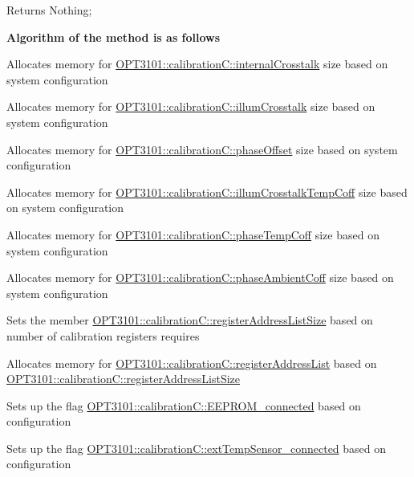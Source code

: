 \begin{DoxyReturn}{Returns}
Nothing; 
\end{DoxyReturn}
{\bfseries Algorithm of the method is as follows}
\begin{DoxyItemize}
\item Allocates memory for \mbox{\hyperlink{class_o_p_t3101_1_1calibration_c_a4df5b876541e9b33eadf6290fe08b7e5}{O\+P\+T3101\+::calibration\+C\+::internal\+Crosstalk}} size based on system configuration
\item Allocates memory for \mbox{\hyperlink{class_o_p_t3101_1_1calibration_c_ac09121c7057093506de63d6e2ea3a4b7}{O\+P\+T3101\+::calibration\+C\+::illum\+Crosstalk}} size based on system configuration
\item Allocates memory for \mbox{\hyperlink{class_o_p_t3101_1_1calibration_c_a06f6a097057b9ed8f4914f4027d709c1}{O\+P\+T3101\+::calibration\+C\+::phase\+Offset}} size based on system configuration
\item Allocates memory for \mbox{\hyperlink{class_o_p_t3101_1_1calibration_c_ac7bcc22317965bb378479fb016c20d3c}{O\+P\+T3101\+::calibration\+C\+::illum\+Crosstalk\+Temp\+Coff}} size based on system configuration
\item Allocates memory for \mbox{\hyperlink{class_o_p_t3101_1_1calibration_c_a277a7bbf506f5f5181719311d10bc610}{O\+P\+T3101\+::calibration\+C\+::phase\+Temp\+Coff}} size based on system configuration
\item Allocates memory for \mbox{\hyperlink{class_o_p_t3101_1_1calibration_c_ab69d912cc3cad353abeb73d7a95b7428}{O\+P\+T3101\+::calibration\+C\+::phase\+Ambient\+Coff}} size based on system configuration
\item Sets the member \mbox{\hyperlink{class_o_p_t3101_1_1calibration_c_a5331ffae8b40e63d277b907a6bf84aa3}{O\+P\+T3101\+::calibration\+C\+::register\+Address\+List\+Size}} based on number of calibration registers requires
\item Allocates memory for \mbox{\hyperlink{class_o_p_t3101_1_1calibration_c_a8ddd81159778cc987557c9b4920d5b57}{O\+P\+T3101\+::calibration\+C\+::register\+Address\+List}} based on \mbox{\hyperlink{class_o_p_t3101_1_1calibration_c_a5331ffae8b40e63d277b907a6bf84aa3}{O\+P\+T3101\+::calibration\+C\+::register\+Address\+List\+Size}}
\item Sets up the flag \mbox{\hyperlink{class_o_p_t3101_1_1calibration_c_ac56e02e52f84fb4a601b0104e0c6b607}{O\+P\+T3101\+::calibration\+C\+::\+E\+E\+P\+R\+O\+M\+\_\+connected}} based on configuration
\item Sets up the flag \mbox{\hyperlink{class_o_p_t3101_1_1calibration_c_a703a4667679ca3cfd19801908cdbf153}{O\+P\+T3101\+::calibration\+C\+::ext\+Temp\+Sensor\+\_\+connected}} based on configuration 
\end{DoxyItemize}\mbox{\label{class_o_p_t3101_1_1calibration_c_adaa42643a7b88087e4909f7017a85ef4}} 
